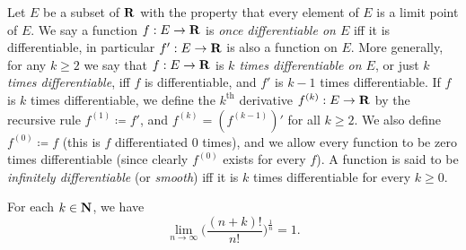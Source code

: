 \begin{definition}\label{4.2.4}
  Let \(E\) be a subset of \(\mathbf{R}\) with the property that every element of \(E\) is a limit point of \(E\).
  We say a function \(f : E \to \mathbf{R}\) is \emph{once differentiable on \(E\)} iff it is differentiable, in particular \(f': E \to \mathbf{R}\) is also a function on \(E\).
  More generally, for any \(k \geq 2\) we say that \(f : E \to \mathbf{R}\) is \emph{\(k\) times differentiable on \(E\)}, or just \emph{\(k\) times differentiable}, iff \(f\) is differentiable, and \(f'\) is \(k - 1\) times differentiable.
  If \(f\) is \(k\) times differentiable, we define the \(k^{\text{th}}\) derivative \(f^{(k)} : E \to \mathbf{R}\) by the recursive rule \(f^{(1)} \coloneqq f'\), and \(f^{(k)} = (f^{(k - 1)})'\) for all \(k \geq 2\).
  We also define \(f^{(0)} \coloneqq f\) (this is \(f\) differentiated \(0\) times), and we allow every function to be zero times differentiable (since clearly \(f^{(0)}\) exists for every \(f\)).
  A function is said to be \emph{infinitely differentiable} (or \emph{smooth}) iff it is \(k\) times differentiable for every \(k \geq 0\).
\end{definition}

\begin{additional corollary}\label{ac 4.2.1}
For each \(k \in \mathbf{N}\), we have
\[
  \lim_{n \to \infty} \bigg(\frac{(n + k)!}{n!}\bigg)^{\frac{1}{n}} = 1.
\]
\end{additional corollary}


